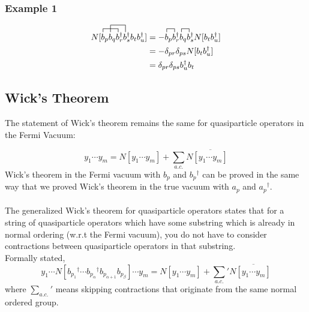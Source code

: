 \documentclass{article}
\newcommand{\ol}{\overline}
\newcommand{\fctr}{\contraction}
\newcommand{\dg}{\ensuremath{^\dagger} }
\newcommand{\cd}{\ensuremath{\cdots} }
\begin{document}
\subsubsection{Example 1}
\begin{align*}
N[\fctr{}{b}{{}_p b_q}{b}
\fctr[2ex]{ b_p}{b}{{}_q b_r\dg}{b}
 b_p b_q b_r\dg b_s\dg b_t b_u\dg ]  &= 
 - \fctr{}{b}{{}_p}{b}b_p b_r\dg \fctr{}{b}{{}_q}{b}b_q b_s\dg N[b_t b_u\dg] \\
 &= - \delta_{pr}\delta_{ps}N[b_t b_u\dg] \\
 &= \delta_{pr}\delta_{ps} b_u\dg b_t 
\end{align*}

\subsection{Wick's Theorem }

The statement of Wick's theorem remains the same for quasiparticle operators in the Fermi Vacuum: 

\[y_1 \cd y_m = N[y_1\cd y_m] + \sum_{a.c.} N\ol{[y_1 \cd y_m]} \]
Wick's theorem in the Fermi vacuum with $b_p$ and $b_p\dg$ 
can be proved in the same way that we proved Wick's theorem in the true vacuum with 
$a_p$ and $a_p\dg$.
\\ \\
The generalized Wick's theorem for quasiparticle operators states 
that for a string of quasiparticle operators which have some substring which is already in normal ordering (w.r.t the Fermi vacuum),
you do not have to consider contractions between quasiparticle operators in that substring.\\
Formally stated,
$$y_1 \cd N[b_{p_1}\dg \cd b_{p_\alpha}\dg b_{p_{\alpha + 1}} b_{p_\beta}] \cd y_m = N[y_1 \cd y_m ]  + \sum_{a.c.} {}' N\ol{[y_1 \cd y_m ]} $$
where $\sum_{a.c.} {}'$ means skipping contractions that originate from the same normal ordered group.
\end{document}

